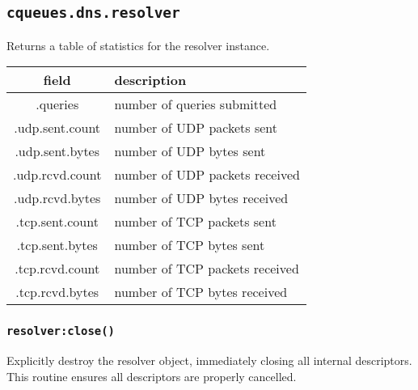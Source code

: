 \documentclass[11pt, oneside]{memoir}
\newcommand{\fn}[1]{\texttt{#1} }
\newcounter{toccols}
\newenvironment{Module}[1]{
	\subsection{\texttt{#1}}
	\addtocontents{toc}{
		\protect\begin{multicols}{\value{toccols}}
	}
}{
	\addtocontents{toc}{\protect\end{multicols}}
}
\begin{document}
\begin{Module}{cqueues.dns.resolver}
Returns a table of statistics for the resolver instance.

\begin{tabular}{ c | p{5in}}
field & description\\\hline
.queries & number of queries submitted \\
.udp.sent.count & number of UDP packets sent \\
.udp.sent.bytes & number of UDP bytes sent \\
.udp.rcvd.count & number of UDP packets received \\
.udp.rcvd.bytes & number of UDP bytes received \\
.tcp.sent.count & number of TCP packets sent \\
.tcp.sent.bytes & number of TCP bytes sent \\
.tcp.rcvd.count & number of TCP packets received \\
.tcp.rcvd.bytes & number of TCP bytes received \\

\end{tabular}
\subsubsection[\fn{resolver:close}]{\fn{resolver:close()}}

Explicitly destroy the resolver object, immediately closing all internal descriptors. This routine ensures all descriptors are properly cancelled.

\end{Module}
\end{document}

